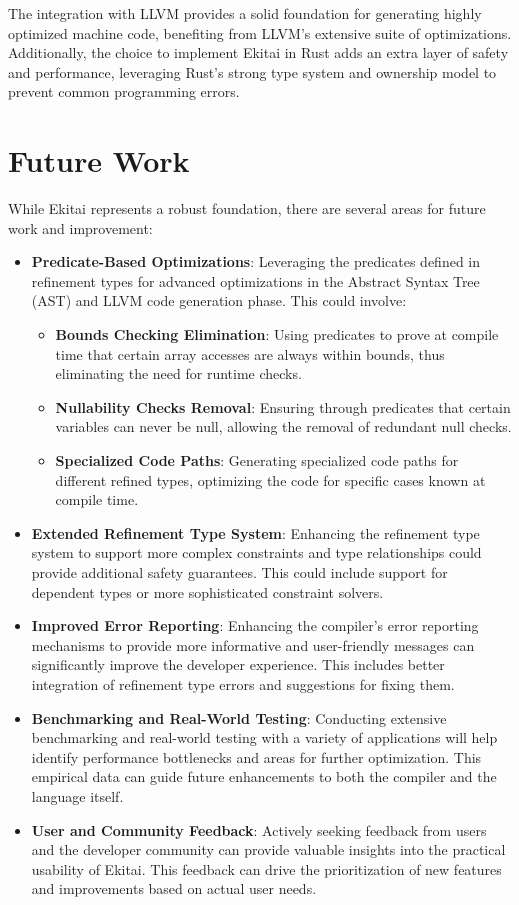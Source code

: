 \documentclass[
  oneside,
  english,
  coorientadorbanca,
  noabntexcite
]{ufsc-thesis-rn46-2019}
\begin{document}
The integration with LLVM provides a solid foundation for generating highly optimized machine code, benefiting from LLVM's extensive suite of optimizations. Additionally, the choice to implement Ekitai in Rust adds an extra layer of safety and performance, leveraging Rust's strong type system and ownership model to prevent common programming errors.

\section{Future Work}

While Ekitai represents a robust foundation, there are several areas for future work and improvement:

\begin{itemize}
    \item \textbf{Predicate-Based Optimizations}: Leveraging the predicates defined in refinement types for advanced optimizations in the Abstract Syntax Tree (AST) and LLVM code generation phase. This could involve:
    \begin{itemize}
        \item \textbf{Bounds Checking Elimination}: Using predicates to prove at compile time that certain array accesses are always within bounds, thus eliminating the need for runtime checks.
        \item \textbf{Nullability Checks Removal}: Ensuring through predicates that certain variables can never be null, allowing the removal of redundant null checks.
        \item \textbf{Specialized Code Paths}: Generating specialized code paths for different refined types, optimizing the code for specific cases known at compile time.
    \end{itemize}
    \item \textbf{Extended Refinement Type System}: Enhancing the refinement type system to support more complex constraints and type relationships could provide additional safety guarantees. This could include support for dependent types or more sophisticated constraint solvers.
    \item \textbf{Improved Error Reporting}: Enhancing the compiler's error reporting mechanisms to provide more informative and user-friendly messages can significantly improve the developer experience. This includes better integration of refinement type errors and suggestions for fixing them.
    \item \textbf{Benchmarking and Real-World Testing}: Conducting extensive benchmarking and real-world testing with a variety of applications will help identify performance bottlenecks and areas for further optimization. This empirical data can guide future enhancements to both the compiler and the language itself.
    \item \textbf{User and Community Feedback}: Actively seeking feedback from users and the developer community can provide valuable insights into the practical usability of Ekitai. This feedback can drive the prioritization of new features and improvements based on actual user needs.
\end{itemize}
\end{document}
